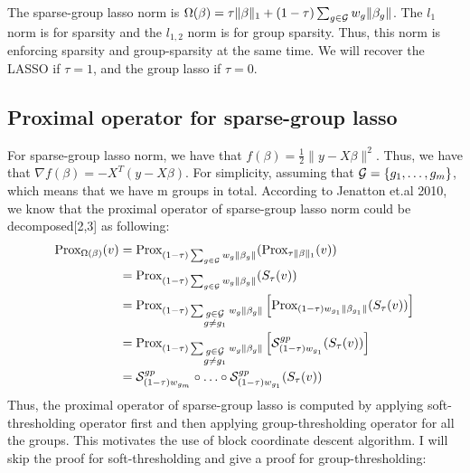 \documentclass{article}
\def\cS{{\cal S}}
\def\cG{{\cal G}}
\begin{document}
The sparse-group lasso norm is $\Omega(\beta) = \tau \|\beta\|_1 + (1-\tau)\sum_{g \in \cal{G}} w_g \|\beta_g\|$.  The  $l_1$ norm is for sparsity and the $l_{1,2}$ norm is for group sparsity. Thus, this norm is enforcing sparsity and group-sparsity at the same time.  We will recover the LASSO if $\tau = 1$, and the group lasso if $\tau = 0$. 


\subsection{Proximal operator for sparse-group lasso}



For sparse-group lasso norm, we have that $f(\beta) = \frac{1}{2} \|y - X\beta\|^2$. Thus, we have that $\nabla f(\beta) = -X^T(y-X\beta)$. 
For simplicity, assuming that $\cG = \{g_1,\ldots,g_m\}$, which means that we have m groups in total. According to Jenatton et.al 2010, we know that the proximal operator of sparse-group lasso norm could be decomposed[2,3] as following:
\begin{equation}
\begin{aligned}
\text{Prox}_{\Omega(\beta)}(v) & = \text{Prox}_{(1-\tau)\sum_{g \in \cal{G}}w_g\|\beta_g\|}(\text{Prox}_{\tau \|\beta\|_1}(v)) \\
& = \text{Prox}_{(1-\tau)\sum_{g \in \cal{G}}w_g\|\beta_g\|}(S_{\tau}(v))\\
& = \text{Prox}_{(1-\tau)\sum_{\substack{g \in \cal{G} \\ g \neq g_1}}w_g\|\beta_g\|}\left[\text{Prox}_{(1-\tau)w_{g_1}\|\beta_{g_1}\|}(S_{\tau}(v))\right]\\
& = \text{Prox}_{(1-\tau)\sum_{\substack{g \in \cal{G} \\ g \neq g_1}}w_g\|\beta_g\|}\left[\cS^{gp}_{(1-\tau)w_{g_1}}(S_{\tau}(v))\right]\\
& = \cS^{gp}_{(1-\tau)w_{g_m}} \circ \ldots \circ \cS^{gp}_{(1-\tau)w_{g_1}}(S_{\tau}(v))\\
\end{aligned}
\end{equation}
Thus, the proximal operator of sparse-group lasso is computed by applying soft-thresholding operator first and then applying group-thresholding operator for all the groups.  This motivates the use of block coordinate descent algorithm.  I will skip the proof for soft-thresholding and give a proof for group-thresholding:
\end{document}
